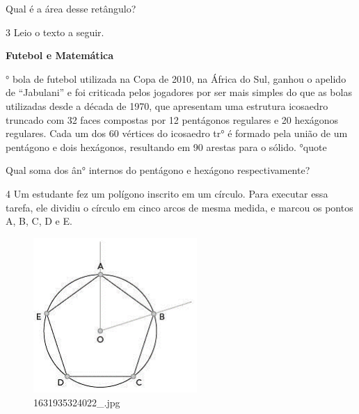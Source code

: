 \begin{escolha}
\begin{escolha}
\begin{escolha}
\begin{escolha}
{\begin{boxmedio}
Qual é a área desse retângulo?

\begin{boxpeq}


\num{3} Leio o texto a seguir.

\begin{q°}
\textbf{Futebol e Matemática}

° bola de futebol utilizada na Copa de 2010, na África do Sul, ganhou o
apelido de ``Jabulani'' e foi criticada pelos jogadores por ser mais
simples do que as bolas utilizadas desde a década de 1970, que
apresentam uma estrutura icosaedro truncado com 32 faces compostas por
12 pentágonos regulares e 20 hexágonos regulares. Cada um dos 60
vértices do icosaedro tr° é formado pela união de um pentágono e
dois hexágonos, resultando em 90 arestas para o sólido.
\e°{quote}

Qual soma dos ân° internos do pentágono e hexágono respectivamente?

\begin{boxmedio}


\num{4} Um estudante fez um polígono inscrito em um círculo. Para executar
essa tarefa, ele dividiu o círculo em cinco arcos de mesma medida, e
marcou os pontos A, B, C, D e E.

\begin{figure}
\centering
\includegraphics[width=2.45291in,height=2.3178in]{./_SAEB_9_MAT/media/image188.png}
\caption{1631935324022\_.jpg}
\end{figure}


\end{boxmedio}
\end{q°}
\end{boxpeq}
\end{boxmedio}}
\end{escolha}
\end{escolha}
\end{escolha}
\end{escolha}
